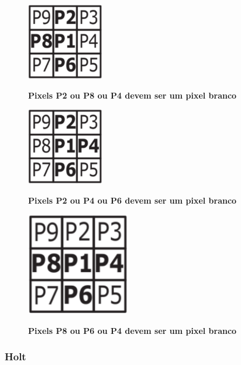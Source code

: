 \documentclass[12pt,oneside,a4paper,english,french,spanish,brazil,]{abntex2}
\begin{document}
\begin{figure}[ht]
\centering
\caption{\textbf{Pixels P2 ou P8 ou P4 devem ser um pixel branco}}
\includegraphics[width=0.3\textwidth]{imagens/PDI_Zhang_Suen_3.PNG}
\label{fig:PDI_Zhang_Suen_3}
\end{figure}

\begin{figure}[ht]
\centering
\caption{\textbf{Pixels P2 ou P4 ou P6 devem ser um pixel branco}}
\includegraphics[width=0.3\textwidth]{imagens/PDI_Zhang_Suen_4.PNG}
\label{fig:PDI_Zhang_Suen_4}
\end{figure}

\begin{figure}[ht]
\centering
\caption{\textbf{Pixels P8 ou P6 ou P4 devem ser um pixel branco}}
\includegraphics[width=0.4\textwidth]{imagens/PDI_Zhang_Suen_5.PNG}
\label{fig:PDI_Zhang_Suen_5}
\end{figure}

\subsubsection{Holt}
\end{document}
